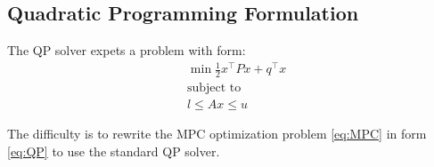 \documentclass[a4paper,12pt,fleqn]{article}
\begin{document}
\subsection{Quadratic Programming Formulation}
The QP solver expets a problem with form: 
\begin{subequations}
\label{eq:QP}
\begin{align}
 &\min \frac{1}{2} x^\top P x +  q^\top x \\
 &\text{subject to} \nonumber \\
 &l \leq Ax \leq u
\end{align}
\end{subequations}

The difficulty is to rewrite the MPC optimization problem \eqref{eq:MPC} in form
\eqref{eq:QP} to use the standard QP solver.
\end{document}
